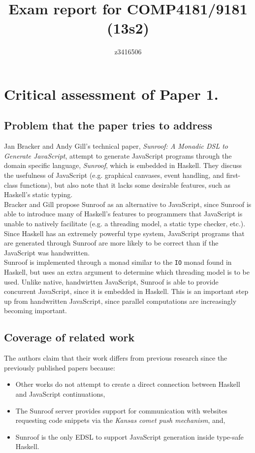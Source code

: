 \documentclass[9pt]{report}
\title{Exam report for COMP4181/9181 (13s2)}
\author{z3416506}
\date{}
\begin{document}
\maketitle
\clearpage

\section*{Critical assessment of Paper 1.}
\subsection*{Problem that the paper tries to address}
Jan Bracker and Andy Gill's technical paper, {\it Sunroof: A Monadic DSL to Generate JavaScript}, attempt to generate JavaScript programs through the domain specific language, {\it Sunroof}, which is embedded in Haskell.
They discuss the usefulness of JavaScript (e.g. graphical canvases, event handling, and first-class functions), but also note that it lacks some desirable features, such as Haskell's static typing.\\

Bracker and Gill propose Sunroof as an alternative to JavaScript, since Sunroof is able to introduce many of Haskell's features to programmers that JavaScript is unable to natively facilitate (e.g. a threading model, a static type checker, etc.).
Since Haskell has an extremely powerful type system, JavaScript programs that are generated through Sunroof are more likely to be correct than if the JavaScript was handwritten.\\

Sunroof is implemented through a monad similar to the \verb/IO/ monad found in Haskell, but uses an extra argument to determine which threading model is to be used.
Unlike native, handwirtten JavaScript, Sunroof is able to provide concurrent JavaScript, since it is embedded in Haskell.
This is an important step up from handwritten JavaScript, since parallel computations are increasingly becoming important.

\subsection*{Coverage of related work}
The authors claim that their work differs from previous research since the previously published papers because:

\begin{itemize}
\item Other works do not attempt to create a direct connection between Haskell and JavaScript continuations,
\item The Sunroof server provides support for communication with websites requesting code snippets via the {\it Kansas comet push mechanism}, and,
\item Sunroof is the only EDSL to support JavaScript generation inside type-safe Haskell.
\end{itemize}
\end{document}
